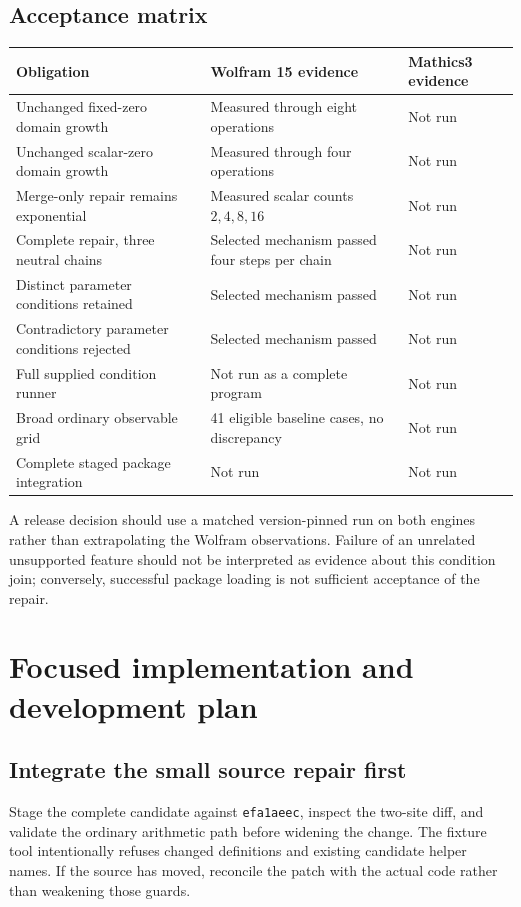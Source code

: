 \documentclass[11pt,a4paper]{article}
\newcommand{\commit}{\texttt{efa1aeec}}
\begin{document}
\subsection{Acceptance matrix}
\begin{longtable}{@{}P{61mm}P{43mm}P{45mm}@{}}\toprule
Obligation & Wolfram 15 evidence & Mathics3 evidence\\\midrule\endhead
Unchanged fixed-zero domain growth & Measured through eight operations & Not run\\
Unchanged scalar-zero domain growth & Measured through four operations & Not run\\
Merge-only repair remains exponential & Measured scalar counts $2,4,8,16$ & Not run\\
Complete repair, three neutral chains & Selected mechanism passed four steps per chain & Not run\\
Distinct parameter conditions retained & Selected mechanism passed & Not run\\
Contradictory parameter conditions rejected & Selected mechanism passed & Not run\\
Full supplied condition runner & Not run as a complete program & Not run\\
Broad ordinary observable grid & 41 eligible baseline cases, no discrepancy & Not run\\
Complete staged package integration & Not run & Not run\\\bottomrule
\end{longtable}

A release decision should use a matched version-pinned run on both engines rather than extrapolating the Wolfram observations. Failure of an unrelated unsupported feature should not be interpreted as evidence about this condition join; conversely, successful package loading is not sufficient acceptance of the repair.

\section{Focused implementation and development plan}
\label{sec:plan}

\subsection{Integrate the small source repair first}
Stage the complete candidate against \commit, inspect the two-site diff, and validate the ordinary arithmetic path before widening the change. The fixture tool intentionally refuses changed definitions and existing candidate helper names. If the source has moved, reconcile the patch with the actual code rather than weakening those guards.
\end{document}
